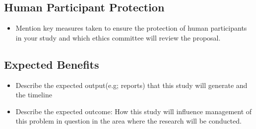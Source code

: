 \documentclass[10pt, a4paper]{article}
\begin{document}
\subsection*{Human Participant Protection}
\begin{itemize}
	\item Mention key measures taken to ensure the protection of human participants in your study and which ethics committee will review the proposal. 
\end{itemize}


\subsection*{Expected Benefits}
\begin{itemize}
	\item Describe the expected output(e.g; reports) that this study will generate and the timeline
	\item Describe the expected outcome: How this study will influence management of this problem in question in the area where the research will be conducted.
\end{itemize}



\end{document}
